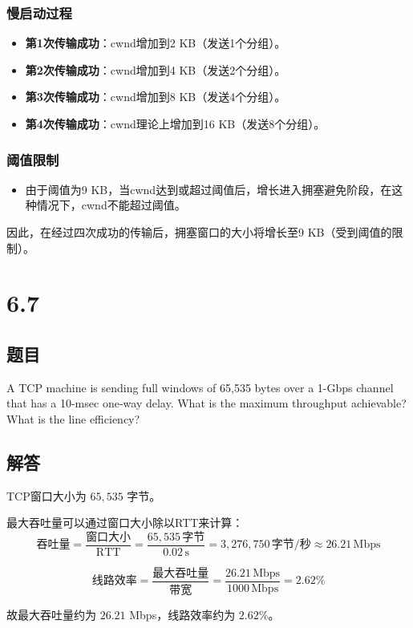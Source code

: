 \documentclass[14pt,a4paper,UTF8,twoside]{article}
\begin{document}
\begin{ans}{}{}
\subsubsection*{慢启动过程}
   \begin{itemize}
       \item \textbf{第1次传输成功}：cwnd增加到2 KB（发送1个分组）。
       \item \textbf{第2次传输成功}：cwnd增加到4 KB（发送2个分组）。
       \item \textbf{第3次传输成功}：cwnd增加到8 KB（发送4个分组）。
       \item \textbf{第4次传输成功}：cwnd理论上增加到16 KB（发送8个分组）。
   \end{itemize}

\subsubsection*{阈值限制}
   \begin{itemize}
       \item 由于阈值为9 KB，当cwnd达到或超过阈值后，增长进入拥塞避免阶段，在这种情况下，cwnd不能超过阈值。
   \end{itemize}

\end{ans}

因此，在经过四次成功的传输后，拥塞窗口的大小将增长至9 KB（受到阈值的限制）。

\section{6.7}

\subsection*{题目}

A TCP machine is sending full windows of 65,535 bytes over a 1-Gbps channel that has a 10-msec one-way delay. What is the maximum throughput achievable? What is the line efficiency?

\subsection*{解答}

\begin{ans}{}{}

    TCP窗口大小为 $65,535$ 字节。
    
    最大吞吐量可以通过窗口大小除以RTT来计算：
    \[
    \text{吞吐量} = \frac{\text{窗口大小}}{\text{RTT}} = \frac{65,535 \, \text{字节}}{0.02 \, \text{s}} = 3,276,750 \, \text{字节/秒} \approx 26.21 \, \text{Mbps}
    \]
    
    \[
    \text{线路效率} = \frac{\text{最大吞吐量}}{\text{带宽}} = \frac{26.21 \, \text{Mbps}}{1000 \, \text{Mbps}} = 2.62\%
    \]
    
    故最大吞吐量约为 $26.21$ Mbps，线路效率约为 $2.62\%$。
    \end{ans}
\end{document}
